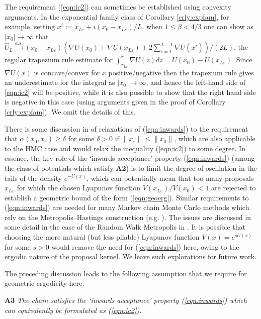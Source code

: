 \documentclass[bj,numbers,noshowframe]{imsart}
\newcommand{\e}{\varepsilon}
\theoremstyle{definition}
\theoremstyle{plain}
\theoremstyle{definition}
\begin{document}
The requirement (\ref{eqn:ic2}) can sometimes be established using convexity arguments. In the exponential family class of Corollary \ref{crly:expfam}, for example, setting $x^i:= x_{L\e} + i(x_0-x_{L\e})/L$, when $1\leq \beta<4/3$ one can show as $|x_0|\to\infty$ that $\hat{U}_L \xrightarrow{a.s.} (x_0-x_{L\e})(\nabla U(x_0) + \nabla U(x_{L\e}) + 2 \sum_{i=1}^{L-1} \nabla U(x^i))/(2L)$, the regular trapezium rule estimate for $\int_{x_{L\e}}^{x_0} \nabla U(z)dz = U(x_0) - U(x_{L\e})$. Since $\nabla U(x)$ is concave/convex for $x$ positive/negative then the trapezium rule gives an underestimate for the integral as $|x_0|\to\infty$, and hence the left-hand side of \eqref{eqn:ic2} will be positive, while it is also possible to show that the right hand side is negative in this case (using arguments given in the proof of Corollary \ref{crly:expfam}).  We omit the details of this.

There is some discussion in \citep{roberts1996exponential} of relaxations of (\ref{eqn:inwards}) to the requirement that $\alpha(x_{0},x_{\e})\geq \delta$ for some $\delta >0$ if $\|x_{\e}\|\leq\|x_{0}\|$,
which are also applicable to the HMC case and would relax the inequality
(\ref{eqn:ic2}) to some degree. In essence, the key role of the `inwards acceptance' property (\ref{eqn:inwards}) (among the
class of potentials which satisfy \textbf{A2}) is to limit the degree of
oscillation in the tails of the density $e^{-U(x)}$, which can potentially
mean that too many proposals $x_{L\e}$ for which the chosen
Lyapunov function $V(x_{L\e})/V(x_{0})<1$ are rejected to establish
a geometric bound of the form (\ref{eqn:geoerg}). Similar requirements to (\ref{eqn:inwards})
are needed for many Markov chain Monte Carlo methods which rely
on the Metropolis--Hastings construction (e.g. \citep{jarner2000geometric,roberts1996geometric,roberts1996exponential}).
The issues are discussed in some detail in the case of the Random
Walk Metropolis in \citep{jarner2000geometric}. It is possible that choosing the more natural
(but less pliable) Lyapunov function $V(x)=e^{sU(x)}$ for some $s>0$
would remove the need for (\ref{eqn:inwards}) here, owing to the ergodic nature
of the proposal kernel. We leave such explorations for future work.

The preceding discussion leads to the following assumption that we require for geometric ergodicity here.

\vspace{0.35cm}

\noindent \textbf{A3} {\itshape The chain satisfies the `inwards acceptance' property (\ref{eqn:inwards}) which can equivalently be formulated as (\ref{eqn:ic2}).} \label{ass:A3}
\end{document}
